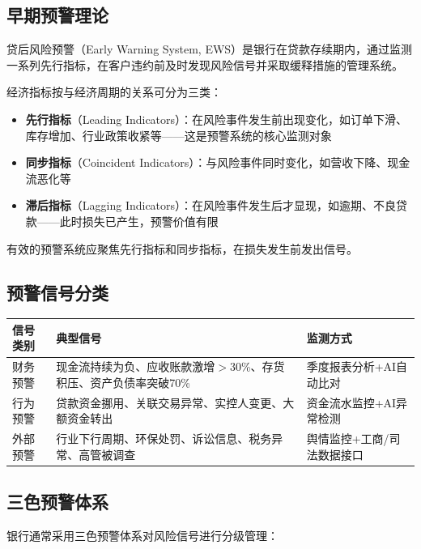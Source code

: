 \subsection{早期预警理论}

贷后风险预警（Early Warning System, EWS）是银行在贷款存续期内，通过监测一系列先行指标，在客户违约前及时发现风险信号并采取缓释措施的管理系统。

经济指标按与经济周期的关系可分为三类：

\begin{itemize}[leftmargin=2em]
  \item \textbf{先行指标}（Leading Indicators）：在风险事件发生前出现变化，如订单下滑、库存增加、行业政策收紧等——这是预警系统的核心监测对象
  \item \textbf{同步指标}（Coincident Indicators）：与风险事件同时变化，如营收下降、现金流恶化等
  \item \textbf{滞后指标}（Lagging Indicators）：在风险事件发生后才显现，如逾期、不良贷款——此时损失已产生，预警价值有限
\end{itemize}

有效的预警系统应聚焦先行指标和同步指标，在损失发生前发出信号。

\subsection{预警信号分类}

\begin{table}[H]
\centering
\begin{tabular}{lp{5cm}p{5cm}}
\toprule
\textbf{信号类别} & \textbf{典型信号} & \textbf{监测方式} \\
\midrule
财务预警 & 现金流持续为负、应收账款激增$>$30\%、存货积压、资产负债率突破70\% & 季度报表分析+AI自动比对 \\
行为预警 & 贷款资金挪用、关联交易异常、实控人变更、大额资金转出 & 资金流水监控+AI异常检测 \\
外部预警 & 行业下行周期、环保处罚、诉讼信息、税务异常、高管被调查 & 舆情监控+工商/司法数据接口 \\
\bottomrule
\end{tabular}
\end{table}

\subsection{三色预警体系}

银行通常采用三色预警体系对风险信号进行分级管理：

